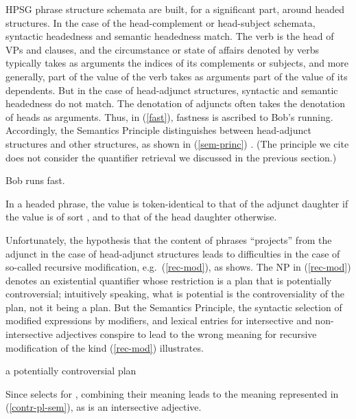 \documentclass[output=paper
	        ,collection
	        ,collectionchapter
 	        ,biblatex
                ,babelshorthands
                ,newtxmath
                ,draftmode
                ,colorlinks, citecolor=brown
]{langscibook}
\begin{document}
HPSG phrase structure schemata are  built, for a significant part, around headed structures. In the case of the head-complement or head-subject schemata, syntactic headedness and semantic headedness match. The verb is the head of VPs and clauses, and the circumstance or state of affairs denoted by verbs typically takes as arguments the indices of its complements or subjects, and more generally, part of the  value of the verb takes as arguments part of the  value of its dependents. But in the case of head-adjunct structures, syntactic and semantic headedness do not match. The denotation of adjuncts often takes the denotation of heads as arguments. Thus, in (\ref{fast}), fastness is ascribed to Bob's running. Accordingly, the Semantics Principle distinguishes between head-adjunct structures and other structures, as shown in (\ref{sem-princ}) \citep[56]{PollardandSag1994}. (The principle we cite does not consider the quantifier retrieval we discussed in the previous section.)

\begin{exe}
\ex\label{fast} Bob runs fast.
\end{exe} 

\begin{exe}
\ex\label{sem-princ}
In a headed phrase, the  value is token-identical to that of the adjunct daughter if the  value is of sort , and to that of the head daughter otherwise.
\end{exe}

Unfortunately, the hypothesis that the content of phrases ``projects'' from the adjunct in the case of head-adjunct structures leads to difficulties in the case of so-called recursive modification, e.g.\ (\ref{rec-mod}), as \citet{Kasper1997} shows. The NP in (\ref{rec-mod}) denotes an existential quantifier whose restriction is a plan that is potentially controversial; intuitively speaking, what is potential is the controversiality of the plan, not it being a plan. But the Semantics Principle, the syntactic selection of modified expressions by modifiers, and lexical entries for intersective and non-intersective adjectives conspire to lead to the wrong meaning for recursive modification of the kind (\ref{rec-mod}) illustrates.

\begin{exe}
\ex\label{rec-mod}a potentially controversial plan
\end{exe}

Since  selects for , combining their meaning leads to the meaning represented in (\ref{contr-pl-sem}), as  is an intersective adjective.
\end{document}
